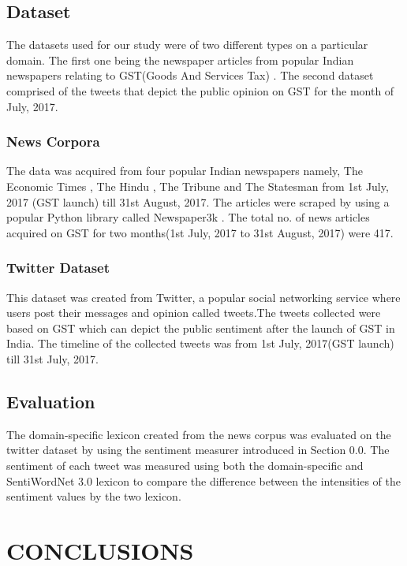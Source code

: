 \documentclass[a4paper, 10pt, conference]{ieeeconf}      %
\begin{document}
\subsection{Dataset}

The datasets used for our study were of two different types on a particular domain. The first one being the newspaper articles from popular Indian newspapers relating to GST(Goods And Services Tax) . The second dataset comprised of the tweets that depict the public opinion on GST for the month of July, 2017.

\subsubsection{News Corpora}

The data was acquired from four popular Indian newspapers namely, The Economic Times \cite{c1}, The Hindu \cite{c2}, The Tribune \cite{c3} and The Statesman \cite{c4} from  1st July, 2017 (GST launch) till 31st August, 2017. The articles were scraped by using a popular Python library called Newspaper3k \cite{c5}. The total no. of news articles acquired on GST for two months(1st July, 2017 to 31st August, 2017) were 417.

\subsubsection{Twitter Dataset}
This dataset was created from Twitter, a popular social networking service where users post their messages and opinion called tweets.The tweets collected were based on GST which can depict the public sentiment after the launch of GST in India. The timeline of the collected tweets was from 1st July, 2017(GST launch) till 31st July, 2017.


\subsection{Evaluation}
The domain-specific lexicon created from the news corpus was evaluated on the twitter dataset by using the sentiment measurer introduced in Section 0.0. The sentiment of each tweet was measured using both the domain-specific and SentiWordNet 3.0 lexicon to compare the difference between the intensities of the sentiment values by the two lexicon.

\section{CONCLUSIONS}
\end{document}
